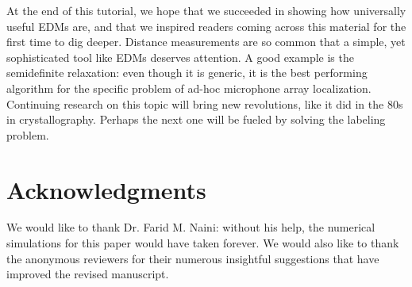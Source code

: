 \documentclass[10pt,double]{IEEEtran}
\begin{document}
At the end of this tutorial, we hope that we succeeded in showing how
universally useful EDMs are, and that we inspired readers coming across this
material for the first time to dig deeper. Distance measurements are so common
that a simple, yet sophisticated tool like EDMs deserves attention. A good
example is the semidefinite relaxation: even though it is generic, it is the
best performing algorithm for the specific problem of ad-hoc microphone array
localization. Continuing research on this topic will bring new revolutions,
like it did in the 80s in crystallography. Perhaps the next one will be fueled
by solving the labeling problem.

\section*{Acknowledgments}

We would like to thank Dr. Farid M. Naini: without his help, the numerical
simulations for this paper would have taken forever. We would also like to
thank the anonymous reviewers for their numerous insightful suggestions that
have improved the revised manuscript.
\end{document}
